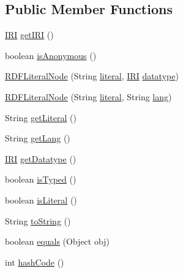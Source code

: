 \subsection*{Public Member Functions}
\begin{DoxyCompactItemize}
\item 
\hyperlink{classorg_1_1semanticweb_1_1owlapi_1_1model_1_1_i_r_i}{I\-R\-I} \hyperlink{classorg_1_1coode_1_1owlapi_1_1rdf_1_1model_1_1_r_d_f_literal_node_af14da8db766145036b70bef66e47a9b7}{get\-I\-R\-I} ()
\item 
boolean \hyperlink{classorg_1_1coode_1_1owlapi_1_1rdf_1_1model_1_1_r_d_f_literal_node_a5046ac0dead7d66f1b3a616978646758}{is\-Anonymous} ()
\item 
\hyperlink{classorg_1_1coode_1_1owlapi_1_1rdf_1_1model_1_1_r_d_f_literal_node_a8c9fcc1aa4139459201922ee1664bf81}{R\-D\-F\-Literal\-Node} (String \hyperlink{classorg_1_1coode_1_1owlapi_1_1rdf_1_1model_1_1_r_d_f_literal_node_aa6ab079c5e807c54becb6cfd2711d1c3}{literal}, \hyperlink{classorg_1_1semanticweb_1_1owlapi_1_1model_1_1_i_r_i}{I\-R\-I} \hyperlink{classorg_1_1coode_1_1owlapi_1_1rdf_1_1model_1_1_r_d_f_literal_node_ae8c5bd75a780a0c218b715deb62b6407}{datatype})
\item 
\hyperlink{classorg_1_1coode_1_1owlapi_1_1rdf_1_1model_1_1_r_d_f_literal_node_aa13d2a8a1e293f6e4173a95c8e14f4c7}{R\-D\-F\-Literal\-Node} (String \hyperlink{classorg_1_1coode_1_1owlapi_1_1rdf_1_1model_1_1_r_d_f_literal_node_aa6ab079c5e807c54becb6cfd2711d1c3}{literal}, String \hyperlink{classorg_1_1coode_1_1owlapi_1_1rdf_1_1model_1_1_r_d_f_literal_node_aa96f18d6a219cfb4a90320f540380bff}{lang})
\item 
String \hyperlink{classorg_1_1coode_1_1owlapi_1_1rdf_1_1model_1_1_r_d_f_literal_node_ab86973713a8636650a7eea2eca017b67}{get\-Literal} ()
\item 
String \hyperlink{classorg_1_1coode_1_1owlapi_1_1rdf_1_1model_1_1_r_d_f_literal_node_aab5c234ac36417398d5a72a66a5c4b7a}{get\-Lang} ()
\item 
\hyperlink{classorg_1_1semanticweb_1_1owlapi_1_1model_1_1_i_r_i}{I\-R\-I} \hyperlink{classorg_1_1coode_1_1owlapi_1_1rdf_1_1model_1_1_r_d_f_literal_node_af7cf0ab716417a8ad5f07d3bb9578899}{get\-Datatype} ()
\item 
boolean \hyperlink{classorg_1_1coode_1_1owlapi_1_1rdf_1_1model_1_1_r_d_f_literal_node_aa0a05826504c9d81dec8e03a493784a4}{is\-Typed} ()
\item 
boolean \hyperlink{classorg_1_1coode_1_1owlapi_1_1rdf_1_1model_1_1_r_d_f_literal_node_a085a77d78b6e15a5b7e1585bbb9c613e}{is\-Literal} ()
\item 
String \hyperlink{classorg_1_1coode_1_1owlapi_1_1rdf_1_1model_1_1_r_d_f_literal_node_a619d373ae268afcb9faef2ccc1efbd28}{to\-String} ()
\item 
boolean \hyperlink{classorg_1_1coode_1_1owlapi_1_1rdf_1_1model_1_1_r_d_f_literal_node_afb477d1d62f2b0cb71e41065e9d6cafc}{equals} (Object obj)
\item 
int \hyperlink{classorg_1_1coode_1_1owlapi_1_1rdf_1_1model_1_1_r_d_f_literal_node_a0aa1346d27e15ac6488c5ea8206be312}{hash\-Code} ()
\end{DoxyCompactItemize}
